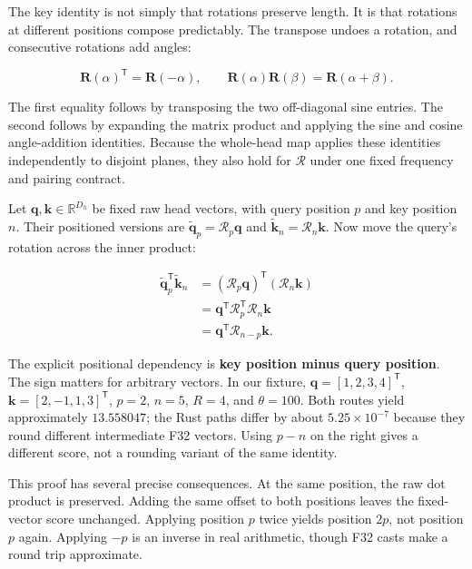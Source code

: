 The key identity is not simply that rotations preserve length. It is
that rotations at different positions compose predictably. The transpose
undoes a rotation, and consecutive rotations add angles:

\begin{equation}
\mathbf{R}(\alpha)^{\mathsf T}=\mathbf{R}(-\alpha),\qquad
\mathbf{R}(\alpha)\mathbf{R}(\beta)=\mathbf{R}(\alpha+\beta).
\end{equation}

The first equality follows by transposing the two off-diagonal sine
entries. The second follows by expanding the matrix product and applying
the sine and cosine angle-addition identities. Because the whole-head
map applies these identities independently to disjoint planes, they also
hold for \(\mathcal{R}\) under one fixed frequency and pairing contract.

Let \(\mathbf{q},\mathbf{k}\in\mathbb{R}^{D_h}\) be fixed raw head
vectors, with query position \(p\) and key position \(n\). Their
positioned versions are
\(\widetilde{\mathbf{q}}_p=\mathcal{R}_p\mathbf{q}\) and
\(\widetilde{\mathbf{k}}_n=\mathcal{R}_n\mathbf{k}\). Now move the
query's rotation across the inner product:

\begin{equation}
\begin{aligned}
\widetilde{\mathbf{q}}_p^{\mathsf T}\widetilde{\mathbf{k}}_n
&=(\mathcal{R}_p\mathbf{q})^{\mathsf T}
  (\mathcal{R}_n\mathbf{k})\\
&=\mathbf{q}^{\mathsf T}\mathcal{R}_p^{\mathsf T}
  \mathcal{R}_n\mathbf{k}\\
&=\mathbf{q}^{\mathsf T}\mathcal{R}_{n-p}\mathbf{k}.
\end{aligned}
\end{equation}

The explicit positional dependency is \textbf{key position minus query
position}. The sign matters for arbitrary vectors. In our fixture,
\(\mathbf{q}=[1,2,3,4]^{\mathsf T}\),
\(\mathbf{k}=[2,-1,1,3]^{\mathsf T}\), \(p=2\), \(n=5\), \(R=4\), and
\(\theta=100\). Both routes yield approximately \(13.558047\); the Rust
paths differ by about \(5.25\times10^{-7}\) because they round different
intermediate F32 vectors. Using \(p-n\) on the right gives a different
score, not a rounding variant of the same identity.

This proof has several precise consequences. At the same position, the
raw dot product is preserved. Adding the same offset to both positions
leaves the fixed-vector score unchanged. Applying position \(p\) twice
yields position \(2p\), not position \(p\) again. Applying \(-p\) is an
inverse in real arithmetic, though F32 casts make a round trip
approximate.

